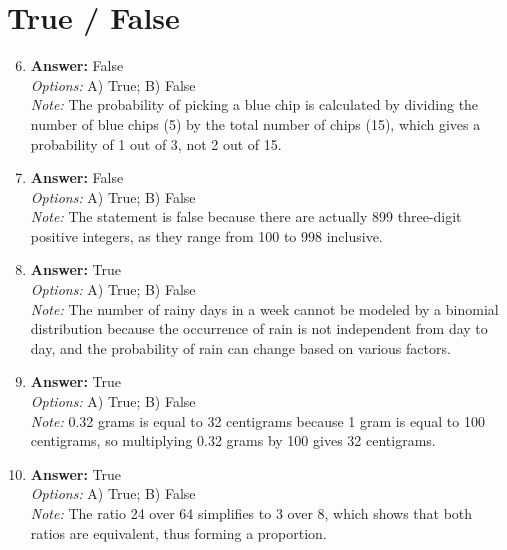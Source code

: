 \documentclass[12pt]{article}
\begin{document}
\section*{True / False}
\begin{enumerate}[label=\arabic*.]
\setcounter{enumi}{5}
\item \textbf{Answer:} False
\\ \textit{Options:} A) True; B) False
\\ \textit{Note:} The probability of picking a blue chip is calculated by dividing the number of blue chips (5) by the total number of chips (15), which gives a probability of 1 out of 3, not 2 out of 15.
\item \textbf{Answer:} False
\\ \textit{Options:} A) True; B) False
\\ \textit{Note:} The statement is false because there are actually 899 three-digit positive integers, as they range from 100 to 998 inclusive.
\item \textbf{Answer:} True
\\ \textit{Options:} A) True; B) False
\\ \textit{Note:} The number of rainy days in a week cannot be modeled by a binomial distribution because the occurrence of rain is not independent from day to day, and the probability of rain can change based on various factors.
\item \textbf{Answer:} True
\\ \textit{Options:} A) True; B) False
\\ \textit{Note:} 0.32 grams is equal to 32 centigrams because 1 gram is equal to 100 centigrams, so multiplying 0.32 grams by 100 gives 32 centigrams.
\item \textbf{Answer:} True
\\ \textit{Options:} A) True; B) False
\\ \textit{Note:} The ratio 24 over 64 simplifies to 3 over 8, which shows that both ratios are equivalent, thus forming a proportion.
\end{enumerate}
\end{document}

